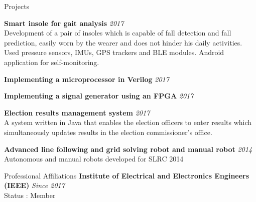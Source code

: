\documentclass[
11pt, %
]{./assets/resume} %
\begin{document}
\begin{rSection}{Projects}

	\textbf{Smart insole for gait analysis} \hfill \textit{2017}\\
	Development of a pair of insoles which is capable of fall detection and fall prediction, easily worn by the wearer and does not hinder his daily activities. Used pressure sensors, IMUs, GPS trackers and BLE modules. Android application for self-monitoring.

	\textbf{Implementing a microprocessor in Verilog} \hfill \textit{2017}

	\textbf{Implementing a signal generator using an FPGA} \hfill \textit{2017}

	\textbf{Election results management system} \hfill \textit{2017}\\
	A system written in Java that enables the election officers to enter results which simultaneously updates results in the election commissioner’s office.

	\textbf{Advanced line following and grid solving robot and manual robot} \hfill \textit{2014}
	Autonomous and manual robots developed for SLRC 2014


\end{rSection}

\begin{rSection}{Professional Affiliations}
	\textbf{Institute of Electrical and Electronics Engineers (IEEE)} \hfill \textit{Since 2017}\\
	Status : Member
	
\end{rSection}



\end{document}
